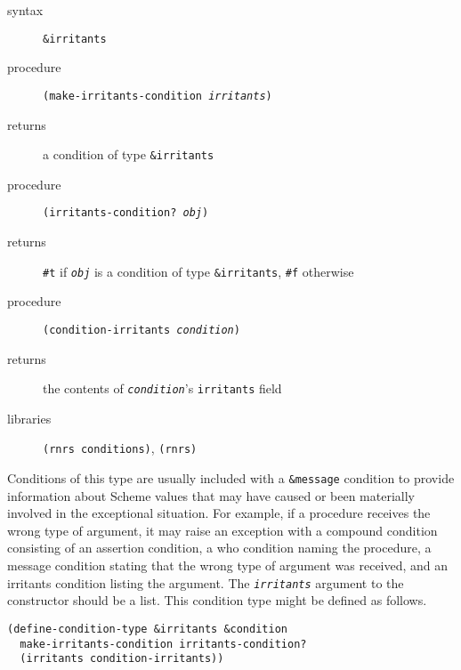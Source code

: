 \begin{description}

\label{exceptions_s25}\item[syntax] \texttt{\&{}irritants}



\item[procedure] \texttt{(make-irritants-condition \textit{irritants})}



\item[returns] a condition of type \texttt{\&{}irritants}


\item[procedure] \texttt{(irritants-condition? \textit{obj})}



\item[returns] \texttt{\#{}t} if \texttt{\textit{obj}} is a condition of type \texttt{\&{}irritants}, \texttt{\#{}f} otherwise


\item[procedure] \texttt{(condition-irritants \textit{condition})}



\item[returns] the contents of \texttt{\textit{condition}}'s \texttt{irritants} field


\item[libraries] \texttt{(rnrs conditions)}, \texttt{(rnrs)}
\end{description}



Conditions of this type are usually included with a \texttt{\&{}message}
condition to provide information about Scheme values that may have caused
or been materially involved in the exceptional situation.
For example, if a procedure receives the wrong type of argument, it
may raise an exception with a compound condition consisting of an
assertion condition, a who condition naming the procedure,
a message condition stating that the wrong type
of argument was received, and an irritants condition listing the
argument.
The \texttt{\textit{irritants}} argument to the constructor should
be a list.
This condition type might be defined as follows.

\begin{alltt}
(define-condition-type \&{}irritants \&{}condition
  make-irritants-condition irritants-condition?
  (irritants condition-irritants))
\end{alltt}

